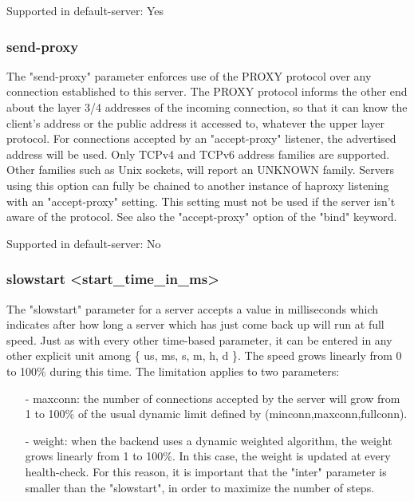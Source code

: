   Supported in default-server: Yes

\subsubsection[send-proxy]{send-proxy}
  The "send-proxy" parameter enforces use of the PROXY protocol over any
  connection established to this server. The PROXY protocol informs the other
  end about the layer 3/4 addresses of the incoming connection, so that it can
  know the client's address or the public address it accessed to, whatever the
  upper layer protocol. For connections accepted by an "accept-proxy" listener,
  the advertised address will be used. Only TCPv4 and TCPv6 address families
  are supported. Other families such as Unix sockets, will report an UNKNOWN
  family. Servers using this option can fully be chained to another instance of
  haproxy listening with an "accept-proxy" setting. This setting must not be
  used if the server isn't aware of the protocol. See also the "accept-proxy"
  option of the "bind" keyword.

  Supported in default-server: No

\subsubsection[slowstart]{slowstart <start\_time\_in\_ms>}
  The "slowstart" parameter for a server accepts a value in milliseconds which
  indicates after how long a server which has just come back up will run at
  full speed. Just as with every other time-based parameter, it can be entered
  in any other explicit unit among \{ us, ms, s, m, h, d \}. The speed grows
  linearly from 0 to 100\% during this time. The limitation applies to two
  parameters:

  \begin{itemize}
  \item[-] maxconn: the number of connections accepted by the server will grow from 1
    to 100\% of the usual dynamic limit defined by (minconn,maxconn,fullconn).

  \item[-] weight: when the backend uses a dynamic weighted algorithm, the weight
    grows linearly from 1 to 100\%. In this case, the weight is updated at every
    health-check. For this reason, it is important that the "inter" parameter
    is smaller than the "slowstart", in order to maximize the number of steps.
  \end{itemize}

